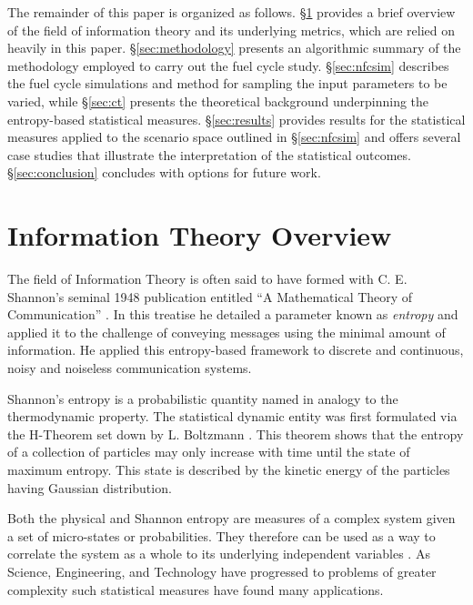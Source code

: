 \documentclass[preprint,12pt]{elsarticle}
\begin{document}
The remainder of this paper is organized as follows.  \S \ref{sec:it-overview} provides a brief overview 
of the field of information theory and its underlying metrics, which are relied on heavily in this paper.
\S \ref{sec:methodology} presents an algorithmic summary of the
methodology employed to carry out the fuel cycle study.  \S \ref{sec:nfcsim} describes the fuel cycle 
simulations and method for sampling the input parameters to be varied, while \S \ref{sec:ct} 
presents the theoretical background underpinning the entropy-based
statistical measures.  \S \ref{sec:results} provides results for the statistical measures applied to the scenario
space outlined in \S \ref{sec:nfcsim} and offers several case studies that illustrate the interpretation
of the statistical outcomes.  \S \ref{sec:conclusion} concludes with options for future work.



\section{Information Theory Overview}
\label{sec:it-overview}

The field of Information Theory is often said to have formed with C. E. Shannon's seminal 1948 publication 
entitled ``A Mathematical Theory of Communication'' \cite{Shannon1948}.  In this treatise he detailed a parameter 
known as \emph{entropy} and applied it to the challenge of conveying messages using the minimal 
amount of information.  He applied this entropy-based framework to discrete and continuous, noisy and noiseless 
communication systems.

Shannon's entropy is a probabilistic quantity named in analogy to the thermodynamic property.
The statistical dynamic entity was first formulated via the H-Theorem set down by L. Boltzmann 
\cite{Boltzmann1872}.  This theorem shows that the entropy of a collection of particles 
may only increase with time until the state of maximum entropy.   This state is described by the
kinetic energy of the particles having Gaussian distribution.  

Both the physical and Shannon entropy are measures of a complex system given a set of 
micro-states or probabilities.  They therefore can be used as a way to correlate the system 
as a whole to its underlying independent variables \cite{Watanabe1960}.  As Science, Engineering, 
and Technology have progressed to problems of greater complexity such statistical measures
have found many applications.
\end{document}
